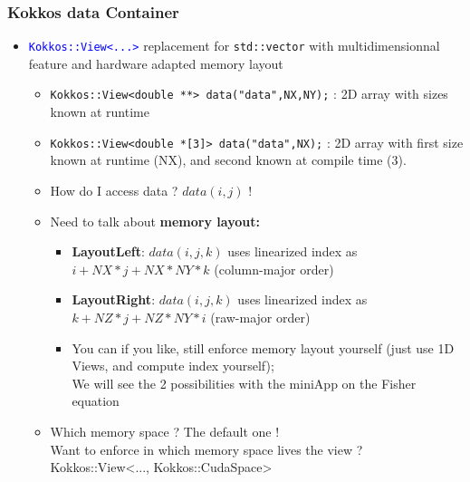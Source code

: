 \begin{frame}[fragile=singleslide]
  \frametitle{Kokkos data Container}

  \begin{itemize}
  \item \textcolor{blue}{\texttt{Kokkos::View<...>}} replacement for \texttt{std::vector} with multidimensionnal feature and hardware adapted memory layout\\
    \begin{itemize}
    \item \texttt{Kokkos::View<double **> data("data",NX,NY);} : 2D array with sizes known at runtime
    \item \texttt{Kokkos::View<double *[3]> data("data",NX);} : 2D array with first size known at runtime (NX), and second known at compile time (3).
    \item How do I access data ? $data(i,j)$ !
    \item Need to talk about \textbf{memory layout:}\\
      \begin{itemize}
      \item \textbf{LayoutLeft}: $data(i,j,k)$ uses linearized index as $i + NX*j + NX*NY * k$ (column-major order)
      \item \textbf{LayoutRight}: $data(i,j,k)$ uses linearized index as $k + NZ*j + NZ*NY * i$ (raw-major order)
      \item You can if you like, still enforce memory layout yourself (just use 1D Views, and compute index yourself);\\
        We will see the 2 possibilities with the miniApp on the Fisher equation
      \end{itemize}
    \item Which memory space ? The default one !\\
      Want to enforce in which memory space lives the view ? Kokkos::View<..., Kokkos::CudaSpace>
    \end{itemize}

  \end{itemize}

\end{frame}


